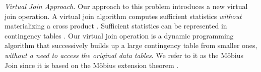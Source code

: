 \documentclass{sig-alternate-2013}
\begin{document}
\emph{Virtual Join Approach.} Our approach to this problem introduces a new virtual join operation. A virtual join algorithm computes sufficient statistics {\em without} materializing a cross product \cite{Yin2004}. Sufficient statistics can be represented in contingency tables \cite{Moore1998}. Our virtual join operation is a dynamic programming algorithm that successively builds up a large contingency table from smaller ones, {\em without a need to access the original data tables}. We refer to it as the M\"obius Join since it is based on the M\"obius extension theorem \cite{Schulte2014}.
%
%
\end{document}

